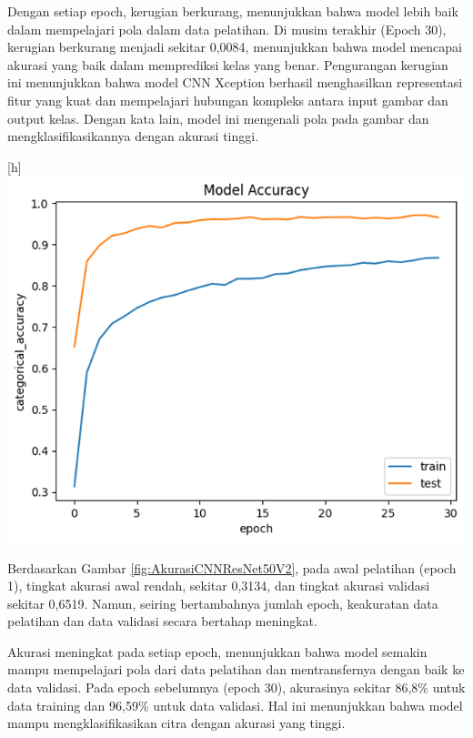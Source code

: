 Dengan setiap epoch, kerugian berkurang, menunjukkan bahwa model lebih baik dalam mempelajari pola dalam data pelatihan. Di musim terakhir (Epoch 30), kerugian berkurang menjadi sekitar 0,0084, menunjukkan bahwa model mencapai akurasi yang baik dalam memprediksi kelas yang benar. Pengurangan kerugian ini menunjukkan bahwa model CNN Xception berhasil menghasilkan representasi fitur yang kuat dan mempelajari hubungan kompleks antara input gambar dan output kelas. Dengan kata lain, model ini mengenali pola pada gambar dan mengklasifikasikannya dengan akurasi tinggi.  
\begin{center}[h]
	\includegraphics[width=0.7\linewidth]{gambar/bener/Accuracy_ModelResNet50V2.png}
	\label{fig:AkurasiCNNResNet50V2}
\end{center}
Berdasarkan Gambar \ref{fig:AkurasiCNNResNet50V2}, pada awal pelatihan (epoch 1), tingkat akurasi awal rendah, sekitar 0,3134, dan tingkat akurasi validasi sekitar 0,6519. Namun, seiring bertambahnya jumlah epoch, keakuratan data pelatihan dan data validasi secara bertahap meningkat.

Akurasi meningkat pada setiap epoch, menunjukkan bahwa model semakin mampu mempelajari pola dari data pelatihan dan mentransfernya dengan baik ke data validasi. Pada epoch sebelumnya (epoch 30), akurasinya sekitar 86,8\% untuk data training dan 96,59\% untuk data validasi. Hal ini menunjukkan bahwa model mampu mengklasifikasikan citra dengan akurasi yang tinggi.  

